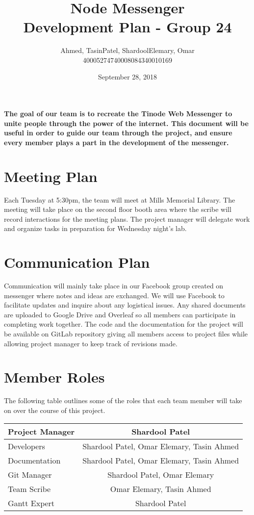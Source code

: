 \documentclass{article}
\title{\Huge\textbf{Node Messenger}\\
		\huge{Development Plan - Group 24}}
\author{Ahmed, Tasin\hspace{1cm}Patel, Shardool\hspace{1cm}Elemary, Omar \\
		400052747\hspace{2cm}400080843\hspace{2cm}40010169}
\date{September 28, 2018}
\begin{document}
\maketitle

\paragraph{The goal of our team is to recreate the Tinode Web Messenger to unite people through the power of the internet. This document will be useful in order to guide our team through the project, and ensure every member plays a part in the development of the messenger.}

\section{Meeting Plan}
Each Tuesday at 5:30pm, the team will meet at Mills Memorial Library. The meeting will take place on the second floor booth area where the scribe will record interactions for the meeting plans. The project manager will delegate work and organize tasks in preparation for Wednesday night's lab.

\section{Communication Plan}
Communication will mainly take place in our Facebook group created on messenger where notes and ideas are exchanged. We will use Facebook to facilitate updates and inquire about any logistical issues. Any shared documents are uploaded to Google Drive and Overleaf so all members can participate in completing work together. The code and the documentation for the project will be available on GitLab repository giving all members access to project files while allowing project manager to keep track of revisions made. 

\section{Member Roles}
The following table outlines some of the roles that each team member will take
on over the course of this project.
\begin{table}[h!]
  \centering
  \label{tab:table}
  \begin{tabular}{||l||c||}
\hline
     Project Manager & Shardool Patel \\
    \hline
     Developers & Shardool Patel, Omar Elemary, Tasin Ahmed \\
\hline
    Documentation & Shardool Patel, Omar Elemary, Tasin Ahmed  \\ \hline
   Git Manager & Shardool Patel, Omar Elemary\\ \hline
   Team Scribe & Omar Elemary, Tasin Ahmed\\ \hline
   Gantt Expert & Shardool Patel\\ \hline

  \end{tabular}

\end{table}
\end{document}
